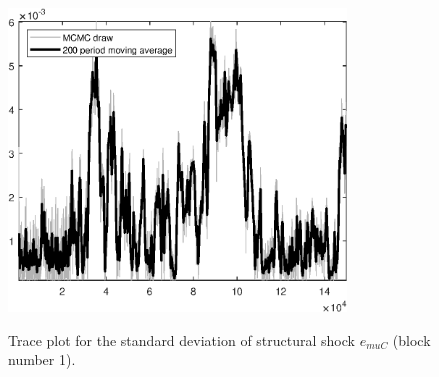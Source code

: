 \begin{figure}[H]
\centering
  \includegraphics[width=0.8\textwidth]{BRS_sectoral_KK/graphs/TracePlot_SE_e_muC_blck_1}\\
    \caption{Trace plot for the standard deviation of structural shock ${e_{muC}}$ (block number 1).}
\end{figure}
